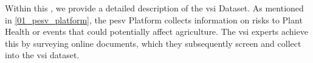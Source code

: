 \label{vsi_dataset}


Within this \headerName{}, we provide a detailed description of the \gls{vsi} Dataset.
As mentioned in \headerName{} \ref{01_pesv_platform}, the \gls{pesv} Platform collects information on risks to Plant Health or events that could potentially affect agriculture. The \gls{vsi} experts achieve this by surveying online documents, which they subsequently screen and collect into the \gls{vsi} dataset.


%
\clearpage